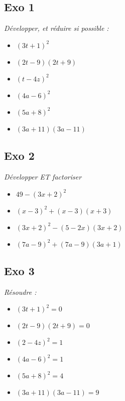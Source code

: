 \documentclass[10pt]{article}
\begin{document}
\subsection*{Exo 1}
\textit{Développer, et réduire si possible : }

\begin{multicols}{3}
\begin{itemize}[label=$\Diamond$]
\item $(3t + 1)^{2}$
\item $(2t - 9)(2t + 9)$
\item $(t -4z)^{2}$
\item $(4a - 6)^{2}$
\item $(5a + 8)^{2}$
\item $(3a + 11)(3a - 11)$
\end{itemize}
\end{multicols}

\subsection*{Exo 2}
\textit{Développer ET factoriser }
\begin{multicols}{2}
\begin{itemize}[label=$\Diamond$]
\item $49 - (3x+ 2)^{2}$
\item $(x - 3)^{2} + (x - 3)(x + 3)$
\item $(3x + 2)^{2} - (5 - 2x)(3x+ 2)$
\item $(7a - 9)^{2} + (7a - 9)(3a + 1)$
\end{itemize}
\end{multicols}

\subsection*{Exo 3}
\textit{Résoudre : }

\begin{multicols}{3}
\begin{itemize}[label=$\Diamond$]
\item $(3t + 1)^{2} = 0$
\item $(2t - 9)(2t + 9) = 0$
\item $(2 -4z)^{2} = 1$
\item $(4a - 6)^{2} = 1$
\item $(5a + 8)^{2} = 4$
\item $(3a + 11)(3a - 11) = 9$
\end{itemize}
\end{multicols}
\end{document}
